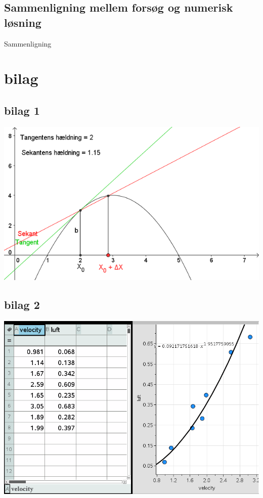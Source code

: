 \documentclass[12pt]{article}
\begin{document}
\subsection{Sammenligning mellem forsøg og numerisk løsning}
Sammenligning

\section{bilag}
\subsection*{bilag 1}
\begin{center}
  \includegraphics[width=\linewidth]{tangentogsekant.png}
\end{center}

\subsection*{bilag 2}
\begin{center}
\includegraphics[width=\linewidth]{Ligningforluftmodstand.png}
\end{center}
\end{document}
